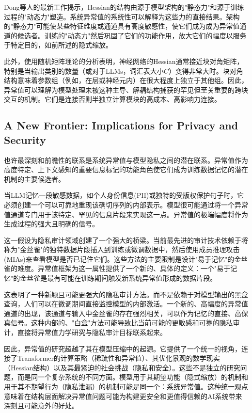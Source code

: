\documentclass{article}
\begin{document}
Dong等人\cite{dong2025hessian}的最新工作揭示，Hessian的结构由源于模型架构的"静态力"和源于训练过程的"动态力"塑造。系统异常值的系统性可以解释为这些力的直接结果。架构的"静态力"可能使某些特征维度或通道具有高度敏感性，使它们成为成为异常值通道的候选者。训练的"动态力"然后巩固了它们的功能作用，放大它们的幅度以服务于特定目的，如前所述的隐式缩放。

此外，使用随机矩阵理论的分析表明，神经网络的Hessian通常接近块对角矩阵，特别是当输出类别的数量（或对于LLMs，词汇表大小$C$）变得非常大时。块对角结构意味着参数组（例如，在层或神经元内）在很大程度上独立于其他组。因此，异常值可以理解为模型处理未被这种主导、解耦结构捕获的罕见但至关重要的跨块交互的机制。它们是连接否则半独立计算模块的高成本、高影响力连接。

\subsection{A New Frontier: Implications for Privacy and Security}

也许最深刻和前瞻性的联系是系统异常值与模型隐私之间的潜在联系。异常值作为高度特定、上下文感知的重要信息标记的功能角色使它们成为训练数据记忆的潜在机制的主要候选者。

当LLM记忆一段敏感数据，如个人身份信息(PII)或独特的受版权保护句子时，它必须创建一个可以可靠地重现该确切序列的内部表示。模型很可能通过将一个异常值通道专门用于该特定、罕见的信息片段来实现这一点。异常值的极端幅度将作为生成过程的强大且明确的信号。

这一假设为隐私审计领域创建了一个强大的桥梁。当前最先进的审计技术依赖于将称为"金丝雀"的独特数据片段插入到训练或微调数据中，然后使用成员推理攻击(MIAs)来查看模型是否已记住它们。这些方法的主要限制是设计"易于记忆"的金丝雀的难度。异常值框架为这一属性提供了一个新的、具体的定义：一个"易于记忆"的金丝雀是最有可能在训练期间触发新系统异常值形成的数据片段。

这表明了一种新颖且可能更强大的隐私审计方法。而不是依赖于对模型输出的黑盒查询，人们可以在微调期间直接监控模型的内部激活。一个新的、高幅度的异常值通道的出现，该通道与输入中金丝雀的存在强烈相关，可以作为记忆的直接、高保真信号。这种内部的、"白盒"方法可能导致比当前可能的更敏感和可靠的隐私审计，直接将异常值力学研究与隐私审计目标联系起来。

因此，异常值的研究超越了其在模型压缩中的起源。它提供了一个统一的视角，连接了Transformer的计算策略（稀疏性和异常值）、其优化景观的数学现实（Hessian结构）以及其最紧迫的社会挑战（隐私和安全）。这些不是独立的研究问题，而是同一个复杂系统的不同方面。模型用于其期望功能（隐式缩放）的机制和用于其不期望行为（隐私泄漏）的机制可能是同一个：系统异常值。这种统一观点意味着在结构层面解决异常值问题可能为构建更安全和更值得信赖的AI系统带来深刻且可能意外的好处。
\end{document}
